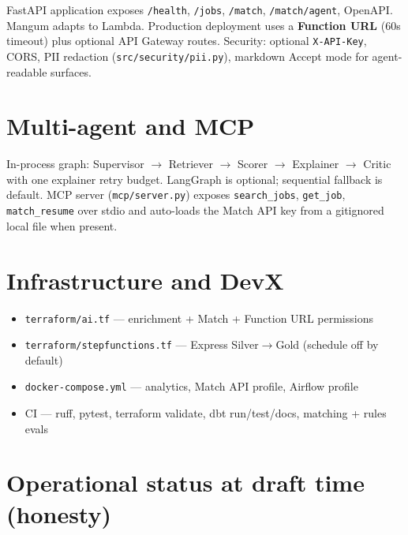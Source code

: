 FastAPI application exposes \texttt{/health}, \texttt{/jobs}, \texttt{/match}, \texttt{/match/agent}, OpenAPI. Mangum adapts to Lambda. Production deployment uses a \textbf{Function URL} (60s timeout) plus optional API Gateway routes. Security: optional \texttt{X-API-Key}, CORS, PII redaction (\texttt{src/security/pii.py}), markdown Accept mode for agent-readable surfaces.

\section{Multi-agent and MCP}

In-process graph: Supervisor $\rightarrow$ Retriever $\rightarrow$ Scorer $\rightarrow$ Explainer $\rightarrow$ Critic with one explainer retry budget. LangGraph is optional; sequential fallback is default. MCP server (\texttt{mcp/server.py}) exposes \texttt{search\_jobs}, \texttt{get\_job}, \texttt{match\_resume} over stdio and auto-loads the Match API key from a gitignored local file when present.

\section{Infrastructure and DevX}

\begin{itemize}[leftmargin=*]
  \item \texttt{terraform/ai.tf} --- enrichment + Match + Function URL permissions
  \item \texttt{terraform/stepfunctions.tf} --- Express Silver$\rightarrow$Gold (schedule off by default)
  \item \texttt{docker-compose.yml} --- analytics, Match API profile, Airflow profile
  \item CI --- ruff, pytest, terraform validate, dbt run/test/docs, matching + rules evals
\end{itemize}

\section{Operational status at draft time (honesty)}

